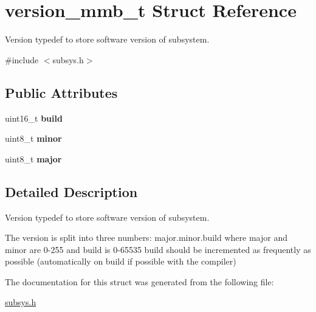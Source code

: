 \hypertarget{structversion__mmb__t}{\section{version\+\_\+mmb\+\_\+t Struct Reference}
\label{structversion__mmb__t}
}


Version typedef to store software version of subsystem.  




{\ttfamily \#include $<$subsys.\+h$>$}

\subsection*{Public Attributes}
\begin{DoxyCompactItemize}
\item 
\hypertarget{structversion__mmb__t_a8c36a49ebe8bbada1ef4b34ad476d1e8}{uint16\+\_\+t {\bfseries build}}\label{structversion__mmb__t_a8c36a49ebe8bbada1ef4b34ad476d1e8}

\item 
\hypertarget{structversion__mmb__t_a5598909a7c8f5b242e5ab40fec0921c3}{uint8\+\_\+t {\bfseries minor}}\label{structversion__mmb__t_a5598909a7c8f5b242e5ab40fec0921c3}

\item 
\hypertarget{structversion__mmb__t_add8ad6d3d9f52f823b09f3181448444f}{uint8\+\_\+t {\bfseries major}}\label{structversion__mmb__t_add8ad6d3d9f52f823b09f3181448444f}

\end{DoxyCompactItemize}


\subsection{Detailed Description}
Version typedef to store software version of subsystem. 

The version is split into three numbers\+: major.\+minor.\+build where major and minor are 0-\/255 and build is 0-\/65535 build should be incremented as frequently as possible (automatically on build if possible with the compiler) 

The documentation for this struct was generated from the following file\+:\begin{DoxyCompactItemize}
\item 
\hyperlink{subsys_8h}{subsys.\+h}\end{DoxyCompactItemize}

